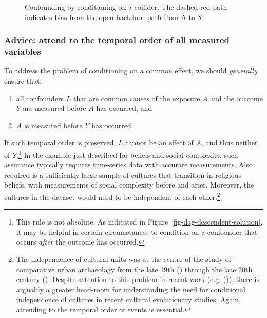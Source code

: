 \documentclass[
  singlecolumn]{article}
\providecommand{\tightlist}{%
  \setlength{\itemsep}{0pt}\setlength{\parskip}{0pt}}\usepackage{longtable,booktabs,array}
\begin{document}
\begin{figure}


\caption{\label{fig-dag-common-effect}Confounding by conditioning on a
collider. The dashed red path indicates bias from the open backdoor path
from A to Y.}

\end{figure}%

\subsubsection{Advice: attend to the temporal order of all measured
variables}\label{advice-attend-to-the-temporal-order-of-all-measured-variables-1}

To address the problem of conditioning on a common effect, we should
\emph{generally} ensure that:

\begin{enumerate}
\def\labelenumi{\arabic{enumi}.}
\tightlist
\item
  all confounders \(L\) that are common causes of the exposure \(A\) and
  the outcome \(Y\) are measured before \(A\) has occurred, and
\item
  \(A\) is measured before \(Y\) has occurred.
\end{enumerate}

If such temporal order is preserved, \(L\) cannot be an effect of \(A\),
and thus neither of \(Y\).\footnote{This rule is not absolute. As
  indicated in Figure~\ref{fig-dag-descendent-solution}, it may be
  helpful in certain circumstances to condition on a confounder that
  occurs \emph{after} the outcome has occurred.} In the example just
described for beliefs and social complexity, such assurance typically
requires time-series data with accurate measurements. Also required is a
sufficiently large sample of cultures that transition in religious
beliefs, with measurements of social complexity before and after.
Moreover, the cultures in the dataset would need to be independent of
each other.\footnote{The independence of cultural units was at the
  centre of the study of comparative urban archaeology from the late
  19th () through the
  late 20th century ().
  Despite attention to this problem in recent work (e.g.
  ()), there is
  arguably a greater head-room for understanding the need for
  conditional independence of cultures in recent cultural evolutionary
  studies. Again, attending to the temporal order of events is
  essential.}
\end{document}
